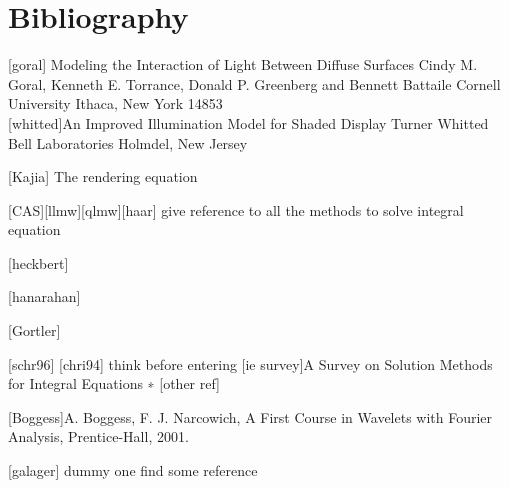 \documentclass[11pt]{article}
\begin{document}
\section{Bibliography}
[goral] Modeling the Interaction of Light Between Diffuse Surfaces
Cindy M. Goral, Kenneth E. Torrance, Donald P. Greenberg and Bennett Battaile
Cornell University
Ithaca, New York 14853 \\

[whitted]An Improved
Illumination Model for
Shaded Display
Turner Whitted
Bell Laboratories
Holmdel, New Jersey 


[Kajia] The rendering equation

[CAS][llmw][qlmw][haar] give reference to all the methods to solve integral equation


[heckbert]


[hanarahan]

[Gortler]

[schr96] [chri94] think before entering
[ie survey]A Survey on Solution Methods for Integral Equations ∗
[other ref]

[Boggess]A. Boggess, F. J. Narcowich, A First Course in Wavelets with Fourier
Analysis, Prentice-Hall, 2001.

[galager] dummy one find some reference
\end{document}
